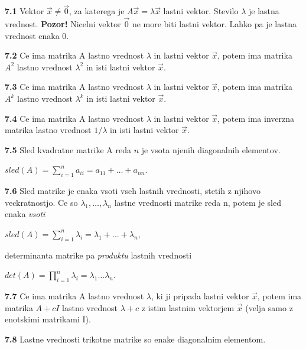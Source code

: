 \documentclass{article}
\begin{document}
\begin{multicols}{2}
\textbf{7.1} Vektor $\vec{x} \neq \vec{0}$, za katerega je $A\vec{x} = \lambda \vec{x}$ lastni vektor. Stevilo
$\lambda$ je lastna vrednost.
\textbf{Pozor!} Nicelni vektor $\vec{0}$ ne more biti lastni vektor. Lahko pa je lastna vrednost enaka 0.

\textbf{7.2} Ce ima matrika A lastno vrednost $\lambda$ in lastni vektor $\vec{x}$, potem ima matrika
$A^{2}$ lastno vrednost $\lambda^{2}$ in isti lastni vektor $\vec{x}$.

\textbf{7.3} Ce ima matrika A lastno vrednost $\lambda$ in lastni vektor $\vec{x}$, potem ima
matrika $A^{k}$ lastno vrednost $\lambda^{k}$ in isti lastni vektor $\vec{x}$.

\textbf{7.4} Ce ima matrika A lastno vrednost $\lambda$ in lastni vektor $\vec{x}$, potem ima
inverzna matrika lastno vrednost $1 / \lambda$ in isti lastni vektor $\vec{x}$.

\textbf{7.5} Sled kvadratne matrike A reda $n$ je vsota njenih diagonalnih elementov.
\begin{center}
    \begin{math}
        sled(A) =
        \sum_{i=1}^{n} a_{ii} =
        a_{11} + \dots + a_{nn}
    \end{math}.
\end{center}

\textbf{7.6} Sled matrike je enaka vsoti vseh lastnih vrednosti, stetih z njihovo veckratnostjo.
Ce so $\lambda_{1}, \dots, \lambda_{n}$ lastne vrednosti matrike reda n, potem je sled enaka \textit{vsoti}
\begin{center}
    \begin{math}
        sled(A) =
        \sum_{i=1}^{n} \lambda_{i} =
        \lambda_{1} + \dots + \lambda_{n}
    \end{math},
\end{center}
determinanta matrike pa \textit{produktu} lastnih vrednosti
\begin{center}
    \begin{math}
        det(A) =
        \prod_{i=1}^{n} \lambda_{i} =
        \lambda_{1} \dots  \lambda_{n}
    \end{math}.
\end{center}

\textbf{7.7} Ce ima matrika A lastno vrednost $\lambda$, ki ji pripada lastni vektor $\vec{x}$,
potem ima matrika $A + cI$ lastno vrednost $\lambda + c$ z istim lastnim vektorjem $\vec{x}$ (velja samo z
enotskimi matrikami I).

\textbf{7.8} Lastne vrednosti trikotne matrike so enake diagonalnim elementom.


\end{multicols}
\end{document}
